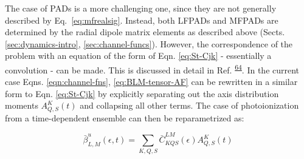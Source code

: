 \documentclass[10pt]{article}
\begin{document}

The case of PADs is a more challenging one, since they are not generally described by Eq.~\ref{eq:mfrealsig}. Instead, both LFPADs and MFPADs are determined by the radial dipole matrix elements as described above (Sects. \ref{sec:dynamics-intro}, \ref{sec:channel-funcs}). However, the correspondence of the problem with an equation of the form of Eqn. \ref{eq:St-Cjk} - essentially a convolution - can be made. This is discussed in detail in Ref. \textsuperscript{\hyperref[csl:64]{64}}. In the current case Eqns. \ref{eqn:channel-fns}, \ref{eq:BLM-tensor-AF} can be rewritten in a similar form to Eqn. \ref{eq:St-Cjk} by explicitly separating out the axis distribution moments $A_{Q,S}^{K}(t)$ and collapsing all other terms. The case of photoionization from a time-dependent ensemble can then be reparametrized as:




\begin{equation}
\bar{\beta}_{L,M}^{u}(\epsilon,t)=\sum_{K,Q,S}\bar{C}_{KQS}^{LM}(\epsilon)A_{Q,S}^{K}(t)
\label{eqn:beta-convolution-C}
\end{equation}
\end{document}
